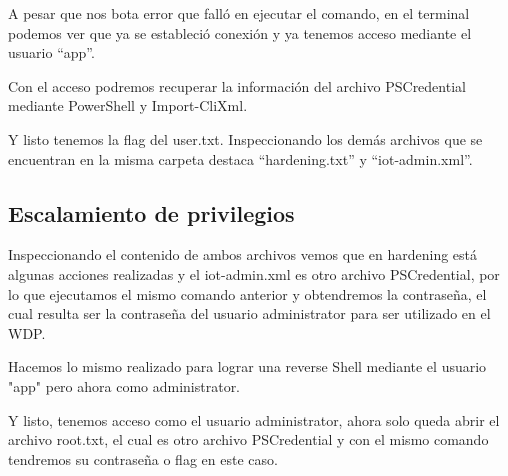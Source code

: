 \documentclass{article}
\begin{document}
A pesar que nos bota error que falló en ejecutar el comando, en el terminal podemos ver que ya se estableció conexión y ya tenemos acceso mediante el usuario “app”.
\begin{figure}[H]
	\center
	\caption{}
\end{figure}

Con el acceso podremos recuperar la información del archivo PSCredential mediante PowerShell y Import-CliXml.
\begin{figure}[H]
	\center
	\caption{}
\end{figure}

Y listo tenemos la flag del user.txt. Inspeccionando los demás archivos que se encuentran en la misma carpeta destaca “hardening.txt” y “iot-admin.xml”.
\begin{figure}[H]
	\center
	\caption{}
\end{figure}

\subsection{Escalamiento de privilegios}

Inspeccionando el contenido de ambos archivos vemos que en hardening está algunas acciones realizadas y el iot-admin.xml es otro archivo PSCredential, por lo que ejecutamos el mismo comando anterior y obtendremos la contraseña, el cual resulta ser la contraseña del usuario administrator para ser utilizado en el WDP.
\begin{figure}[H]
	\center
	\caption{}
\end{figure}
\begin{figure}[H]
	\center
	\caption{}
\end{figure}

Hacemos lo mismo realizado para lograr una reverse Shell mediante el usuario "app" pero ahora como administrator.
\begin{figure}[H]
	\center
	\caption{}
\end{figure}
\begin{figure}[H]
	\center
	\caption{}
\end{figure}
\begin{figure}[H]
	\center
	\caption{}
\end{figure}
\begin{figure}[H]
	\center
	\caption{}
\end{figure}

Y listo, tenemos acceso como el usuario administrator, ahora solo queda abrir el archivo root.txt, el cual es otro archivo PSCredential y con el mismo comando tendremos su contraseña o flag en este caso.
\begin{figure}[H]
	\center
	\caption{}
\end{figure}
\end{document}
